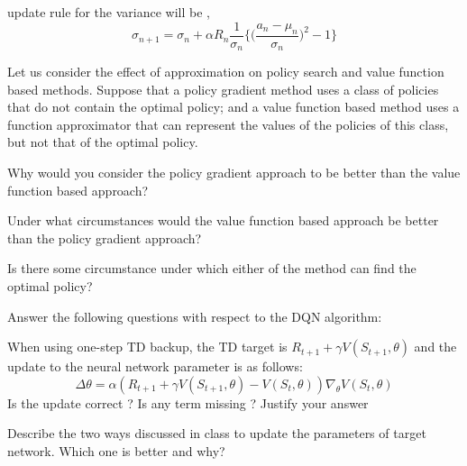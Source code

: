 \documentclass[solution,addpoints,12pt]{exam}
\begin{document}
\begin{questions}
\begin{solution}
update rule for the variance will be ,
\begin{equation}
\sigma_{n+1} = \sigma_{n} + \alpha R_n \frac{1}{\sigma_n} \bigg\{ \bigg(\frac{a_n -\mu_n}{\sigma_n}\bigg)^2 - 1 \bigg\}
\end{equation}


\end{solution}
\question[6]
 Let us consider the effect of approximation on policy search and value function based methods. Suppose that a policy gradient method uses a class of policies that do not contain the optimal policy; and a value function based method uses a function approximator that can represent the values of the policies of this class, but not that of the optimal policy.
 \begin{enumerate}[label=(\alph*)]
     \question[2]  Why would you consider the policy gradient approach to be better than the value function based approach?
     \begin{solution}
     
     \end{solution}
     \question[2]  Under what circumstances would the value function based approach be better than the policy gradient approach?
     \begin{solution}
     
     \end{solution}
     \question[2]  Is there some circumstance under which either of the method can find the optimal policy?
     \begin{solution}
     
     \end{solution}
 
 \end{enumerate}
 

\question[4] Answer the following questions with respect to the DQN algorithm:
\begin{itemize}
    \question [2] When using one-step TD backup, the TD target is $R_{t+1}+\gamma V(S_{t+1},\theta)$ and the update to the neural network parameter is as follows:\\
    \begin{equation}
        \Delta \theta=\alpha(R_{t+1}+\gamma V(S_{t+1},\theta)-V(S_{t},\theta))\nabla_{\theta}V(S_{t},\theta)
    \end{equation}
    Is the update correct ? Is any term missing ? Justify your answer
    \begin{solution}
    
    \end{solution}
    \question [2] Describe the two ways discussed in class to update the parameters of target network. Which one is better and why?
    \begin{solution}
    

\end{solution}
\end{itemize}
\end{questions}
\end{document}
